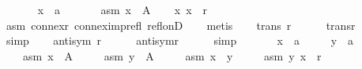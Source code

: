\begin{isabellebody}
\isanewline
\ \ \isamarkupfalse%
\isanewline
\ \ \ \ x\ {\isacharcolon}{\kern0pt}{\isacharcolon}{\kern0pt}\ {\isachardoublequoteopen}{\isacharprime}{\kern0pt}a{\isachardoublequoteclose}\isanewline
\ \ \isamarkupfalse%
\isanewline
\ \ \ \ asm{}{\isacharcolon}{\kern0pt}\ {\isachardoublequoteopen}x\ {\isasymin}\ A{\isachardoublequoteclose}\isanewline
\ \ \isamarkupfalse%
\ {\isachardoublequoteopen}{\isacharparenleft}{\kern0pt}x{\isacharcomma}{\kern0pt}\ x{\isacharparenright}{\kern0pt}\ {\isasymin}\ r{\isachardoublequoteclose}\isanewline
\ \ \ \ \isamarkupfalse%
\ asm{}\ connex{\isacharunderscore}{\kern0pt}r\ connex{\isacharunderscore}{\kern0pt}imp{\isacharunderscore}{\kern0pt}refl\ refl{\isacharunderscore}{\kern0pt}onD\isanewline
\ \ \isamarkupfalse%
\ metis\isanewline
{}\isamarkupfalse%
\isanewline
\ \ \isamarkupfalse%
\ {\isachardoublequoteopen}trans\ r{\isachardoublequoteclose}\isanewline
\ \ \ \ \isamarkupfalse%
\ trans{\isacharunderscore}{\kern0pt}r\isanewline
\ \ \ \ \isamarkupfalse%
\ simp\isanewline
{}\isamarkupfalse%
\isanewline
\ \ \isamarkupfalse%
\ {\isachardoublequoteopen}antisym\ r{\isachardoublequoteclose}\isanewline
\ \ \ \ \isamarkupfalse%
\ antisym{\isacharunderscore}{\kern0pt}r\isanewline
\ \ \ \ \isamarkupfalse%
\ simp\isanewline
{}\isamarkupfalse%
\isanewline
\ \ \isamarkupfalse%
\isanewline
\ \ \ \ x\ {\isacharcolon}{\kern0pt}{\isacharcolon}{\kern0pt}\ {\isachardoublequoteopen}{\isacharprime}{\kern0pt}a{\isachardoublequoteclose}\ \isanewline
\ \ \ \ y\ {\isacharcolon}{\kern0pt}{\isacharcolon}{\kern0pt}\ {\isachardoublequoteopen}{\isacharprime}{\kern0pt}a{\isachardoublequoteclose}\isanewline
\ \ \isamarkupfalse%
\isanewline
\ \ \ \ asm{}{\isacharcolon}{\kern0pt}\ {\isachardoublequoteopen}x\ {\isasymin}\ A{\isachardoublequoteclose}\ \isanewline
\ \ \ \ asm{}{\isacharcolon}{\kern0pt}\ {\isachardoublequoteopen}y\ {\isasymin}\ A{\isachardoublequoteclose}\ \isanewline
\ \ \ \ asm{}{\isacharcolon}{\kern0pt}\ {\isachardoublequoteopen}x\ {\isasymnoteq}\ y{\isachardoublequoteclose}\ \isanewline
\ \ \ \ asm{}{\isacharcolon}{\kern0pt}\ {\isachardoublequoteopen}{\isacharparenleft}{\kern0pt}y{\isacharcomma}{\kern0pt}\ x{\isacharparenright}{\kern0pt}\ {\isasymnotin}\ r{\isachardoublequoteclose}\isanewline

\end{isabellebody}
